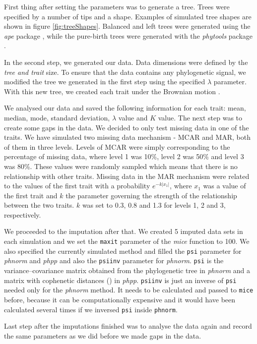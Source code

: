 \documentclass[hidelinks,a4paper]{article}
\begin{document}
\begin{multicols}{2}
First thing after setting the parameters was to generate a tree. Trees were specified by a number of tips and a shape. Examples of simulated tree shapes are shown in figure \ref{fig:treeShapes}. Balanced and left trees were generated using the \emph{ape} package \cite{paradis2004ape}, while the pure-birth trees were generated with the \emph{phytools} package \cite{revell2012phytools}.

In the second step, we generated our data. Data dimensions were defined by the \emph{tree and trait} size. To ensure that the data contains any phylogenetic signal, we modified the tree we generated in the first step using the specified $\lambda$ parameter. With this new tree, we created each trait under the Brownian motion \cite{revell2012phytools}.

We analysed our data and saved the following information for each trait: mean, median, mode, standard deviation, $\lambda$ value and $K$ value. The next step was to create some gaps in the data. We decided to only test missing data in one of the traits. We have simulated two missing data mechanism - MCAR and MAR, both of them in three levels. Levels of MCAR were simply corresponding to the percentage of missing data, where level 1 was 10\%, level 2 was 50\% and level 3 was 80\%. These values were randomly sampled which means that there is no relationship with other traits. Missing data in the MAR mechanism were related to the values of the first trait with a probability $e^{-k |x_1|}$, where $x_1$ was a value of the first trait and $k$ the parameter governing the strength of the relationship between the two traits. $k$ was set to 0.3, 0.8 and 1.3 for levels 1, 2 and 3, respectively.

We proceeded to the imputation after that. We created 5 imputed data sets in each simulation and we set the \texttt{maxit} parameter of the \emph{mice} function to 100. We also specified the currently simulated method and filled the \texttt{psi} parameter for \emph{phnorm} and \emph{phpp} and also the \texttt{psiinv} parameter for \emph{phnorm}. \texttt{psi} is the variance--covariance matrix obtained from the phylogenetic tree in \emph{phnorm} and a matrix with cophenetic distances (\cite{sneath1973numerical}) in \emph{phpp}. \texttt{psiinv} is just an inverse of \texttt{psi} needed only for the \emph{phnorm} method. It needs to be calculated and passed to \texttt{mice} before, because it can be computationally expensive and it would have been calculated several times if we inversed \texttt{psi} inside \texttt{phnorm}.

Last step after the imputations finished was to analyse the data again and record the same parameters as we did before we made gaps in the data.

\end{multicols}
\end{document}
